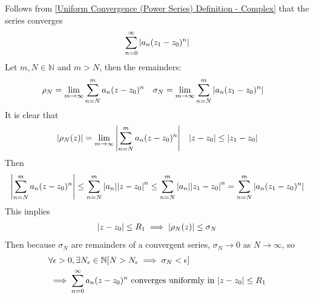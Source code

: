 \documentclass[12pt, english]{book}
\makeatletter
\renewenvironment{proof}[1][\proofname]{\par
	\pushQED{\qed}%
	\normalfont \topsep6\p@\@plus6\p@\relax
	\list{}{%
		\settowidth{\leftmargin}{\itshape\proofname:\hskip\labelsep}%
		\setlength{\labelwidth}{0pt}%
		\setlength{\itemindent}{-\leftmargin}%
		}%
	\item[\hskip\labelsep\itshape#1\@addpunct{:}]\ignorespaces
	}{\popQED\endlist\@endpefalse}
\makeatother
\begin{document}
	\begin{figure}[H]
		\centering
	\end{figure}
	
	\begin{proof}
		Follows from \cref{Uniform Convergence (Power Series) Definition - Complex} that the series converges
		\begin{align*}
			\sum_{n=0}^{\infty} \abs{a_n (z_1 - z_0)^n}
		\end{align*}
		Let \(m, N \in \mathbb{N}\) and \(m > N\), then the remainders: 
		\begin{align*}
			\rho_N &= \lim_{m \rightarrow \infty} \sum_{n=N}^{m} a_n (z-z_0)^n &
			\sigma_N &= \lim_{m \rightarrow \infty} \sum_{n=N}^{m} \abs{a_n (z_1 - z_0)^n}
		\end{align*}
		It is clear that 
		\begin{align*}
			\abs{\rho_N(z)} &= \lim_{m\rightarrow \infty} \abs{\sum_{n=N}^{m} a_n (z-z_0)^n}
				& \abs{z-z_0} \leq \abs{z_1 - z_0}
		\end{align*}
		Then 
		\begin{align*}
			\abs{\sum_{n=N}^{m} a_n (z-z_0)^n} 
			\leq \sum_{n=N}^{m} \abs{a_n} \abs{z-z_0}^n
			\leq \sum_{n=N}^{m} \abs{a_n} \abs{z_1 - z_0}^n
				= \sum_{n=N}^{m} \abs{a_n (z_1 - z_0)^n}
		\end{align*}
		This implies  
		\begin{align*}
			\abs{z-z_0} \leq R_1 \implies \abs{\rho_N (z)} \leq \sigma_N
		\end{align*}
		Then because \(\sigma_N\) are remainders of a convergent series, \(\sigma_N \rightarrow 0\) as \(N \rightarrow \infty\), so
		\begin{align*}
			&\forall \epsilon > 0, \exists N_\epsilon \in \mathbb{N} 
			[N>N_\epsilon \implies \sigma_N < \epsilon] \\
			&\implies \sum_{n=0}^{\infty} a_n (z-z_0)^n \text{ converges uniformly in } \abs{z-z_0}\leq R_1
		\end{align*}
	\end{proof}
	
\end{document}
